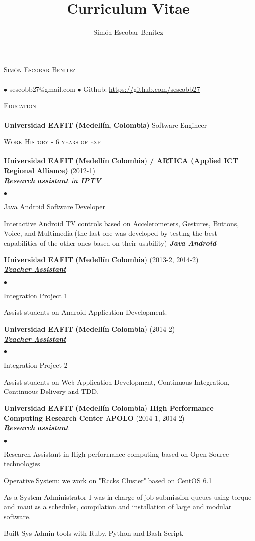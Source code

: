 \documentclass[a4paper]{article}
\title{Curriculum Vitae}
\author{Sim\'on Escobar Benitez}
\newcommand{\lineunder}{\vspace*{-8pt} \\ \hspace*{-18pt} \hrulefill \\}
\newcommand{\header}[1]{{\hspace*{-15pt}\vspace*{6pt}
\textsc{#1}} \vspace*{-6pt} \lineunder}
\newcommand{\employer}[3]{{
\textbf{#1} (#2)\\ \underline{\textbf{\emph{#3}}}\\ }}
\newcommand{\contact}[2]{
\vspace*{-8pt}
\begin{center}
{\LARGE \scshape {#1}} \lineunder #2
\end{center}
\vspace*{-8pt} }
\newenvironment{achievements}{\begin{list}{$\bullet$}{\topsep 0pt \itemsep
-2pt}}{\vspace*{4pt}\end{list}}
\newcommand{\schoolwithcourses}[2]{
\textbf{#1} #2
\vspace*{5pt} }
\newcommand{\emphasys}[1]{\textbf{\emph{#1}}}
\begin{document}
\small
\smallskip
\vspace*{-44pt}
\contact{Sim\'on Escobar Benitez} { $\bullet$ sescobb27@gmail.com $\bullet$ Github: \url{https://github.com/sescobb27} }
\header{Education}
\schoolwithcourses{Universidad EAFIT (Medell\'in, Colombia)}{Software Engineer}

\header{Work History - 6 years of exp}

\employer{ Universidad EAFIT (Medell\'in Colombia) / ARTICA (Applied ICT Regional Alliance)} {2012-1} {Research assistant in IPTV}
\begin{achievements}
\item Java Android Software Developer
\item Interactive Android TV controls based on Accelerometers, Gestures, Buttons, Voice, and Multimedia (the last one was developed by testing the best capabilities of the other ones based on their usability) \emphasys{Java Android}
\end{achievements}

\employer{ Universidad EAFIT (Medell\'in Colombia) }{2013-2, 2014-2}{Teacher Assistant}
\begin{achievements}
\item Integration Project 1
\item Assist students on Android Application Development.
\end{achievements}

\employer{ Universidad EAFIT (Medell\'in Colombia) }{2014-2}{Teacher Assistant}
\begin{achievements}
\item Integration Project 2
\item Assist students on Web Application Development, Continuous Integration, Continuous Delivery and TDD.
\end{achievements}

\employer{ Universidad EAFIT (Medell\'in Colombia) High Performance Computing Research Center APOLO}{2014-1, 2014-2}{Research assistant}
\begin{achievements}
\item Research Assistant in High performance computing based on Open Source technologies
\item Operative System: we work on "Rocks Cluster" based on CentOS 6.1
\item As a System Administrator I was in charge of job submission queues using torque and maui as a scheduler, compilation and installation of large and modular software.
\item Built Sys-Admin tools with Ruby, Python and Bash Script.
\end{achievements}
\end{document}
